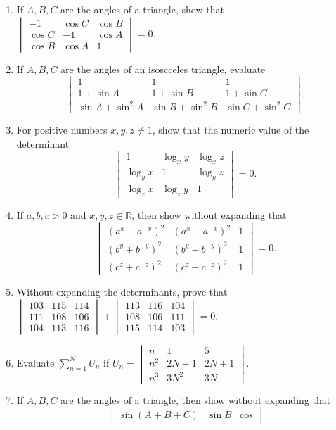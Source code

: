 \begin{enumerate}[resume]
\item If $A, B, C$ are the angles of a triangle, show that $\begin{vmatrix}-1 & \cos C & \cos B\\\cos C & -1 & \cos A\\\cos B &
  \cos A & 1\end{vmatrix} = 0$.
\item If $A, B, C$ are the angles of an isoscceles triangle, evaluate $$\begin{vmatrix}1 & 1 & 1\\1 + \sin A & 1 + \sin B & 1 +
  \sin C\\\sin A + \sin^2A & \sin B + \sin^2B & \sin C + \sin^2C\end{vmatrix}.$$
\item For positive numbers $x, y, z\neq 1$, show that the numeric value of the determinant $$\begin{vmatrix}1 & \log_xy &
  \log_xz\\\log_yx & 1 & \log_yz\\\log_zx & \log_zy & 1\end{vmatrix} = 0.$$
\item If $a, b, c > 0$ and $x, y, z\in\mathbb{R}$, then show without expanding that $$\begin{vmatrix}(a^x + a^{-x})^2 & (a^x -
  a^{-x})^2 & 1\\(b^y + b^{-y})^2 & (b^y - b^{-y})^2 & 1\\(c^z + c^{-z})^2 & (c^z - c^{-z})^2 & 1\end{vmatrix} = 0.$$
\item Without expanding the determinants, prove that $\begin{vmatrix}103 & 115 & 114\\111 & 108 & 106\\ 104 & 113 &
  116\end{vmatrix} + \begin{vmatrix}113 & 116 & 104\\108 & 106 & 111\\115 & 114 & 103\end{vmatrix} = 0$.
\item Evaluate $\displaystyle\sum_{n = 1}^NU_n$ if $U_n = \begin{vmatrix}n & 1 & 5\\n^2 & 2N + 1 & 2N + 1\\n^3 & 3N^2 &
  3N\end{vmatrix}$.
\item If $A, B,C$ are the angles of a triangle, then show without expanding that $$\begin{vmatrix}\sin(A + B + C) & \sin B & \cos

\end{vmatrix}$$
\end{enumerate}
